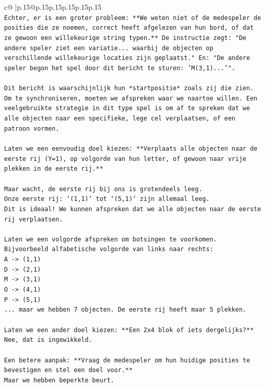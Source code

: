 \documentclass{article}
\begin{document}
{\begin{supertabular}{c@{$\;$}|p{.15\linewidth}@{}p{.15\linewidth}p{.15\linewidth}p{.15\linewidth}p{.15\linewidth}p{.15\linewidth}}
{{{\\ 
\texttt{Echter, er is een groter probleem: **We weten niet of de medespeler de posities die ze noemen, correct heeft afgelezen van hun bord, of dat ze gewoon een willekeurige string typen.** De instructie zegt: "De andere speler ziet een variatie... waarbij de objecten op verschillende willekeurige locaties zijn geplaatst." En: "De andere speler begon het spel door dit bericht te sturen: 'M(3,1)...'".} \\
\\ 
\texttt{Dit bericht is waarschijnlijk hun *startpositie* zoals zij die zien. Om te synchroniseren, moeten we afspreken waar we naartoe willen. Een veelgebruikte strategie in dit type spel is om af te spreken dat we alle objecten naar een specifieke, lege cel verplaatsen, of een patroon vormen.} \\
\\ 
\texttt{Laten we een eenvoudig doel kiezen: **Verplaats alle objecten naar de eerste rij (Y=1), op volgorde van hun letter, of gewoon naar vrije plekken in de eerste rij.**} \\
\\ 
\texttt{Maar wacht, de eerste rij bij ons is grotendeels leeg.} \\
\texttt{Onze eerste rij: `(1,1)` tot `(5,1)` zijn allemaal leeg.} \\
\texttt{Dit is ideaal! We kunnen afspreken dat we alle objecten naar de eerste rij verplaatsen.} \\
\\ 
\texttt{Laten we een volgorde afspreken om botsingen te voorkomen. Bijvoorbeeld alfabetische volgorde van links naar rechts:} \\
\texttt{A {-}> (1,1)} \\
\texttt{D {-}> (2,1)} \\
\texttt{M {-}> (3,1)} \\
\texttt{O {-}> (4,1)} \\
\texttt{P {-}> (5,1)} \\
\texttt{... maar we hebben 7 objecten. De eerste rij heeft maar 5 plekken.} \\
\\ 
\texttt{Laten we een ander doel kiezen: **Een 2x4 blok of iets dergelijks?** Nee, dat is ingewikkeld.} \\
\\ 
\texttt{Een betere aanpak: **Vraag de medespeler om hun huidige posities te bevestigen en stel een doel voor.**} \\
\texttt{Maar we hebben beperkte beurt.} \\
}}}
\end{supertabular}}
\end{document}
